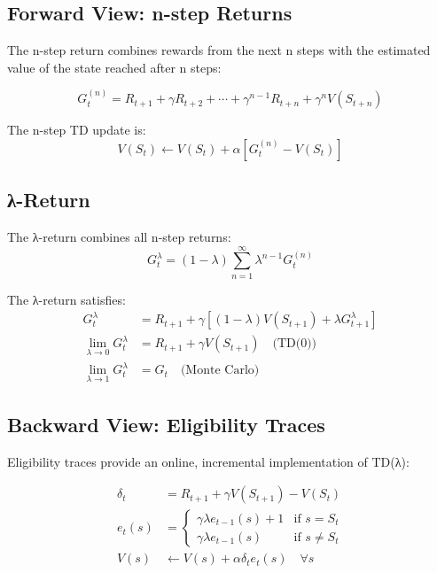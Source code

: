 \subsection{Forward View: n-step Returns}

The n-step return combines rewards from the next n steps with the estimated value of the state reached after n steps:

\begin{equation}
G_t^{(n)} = R_{t+1} + \gamma R_{t+2} + \cdots + \gamma^{n-1} R_{t+n} + \gamma^n V(S_{t+n})
\end{equation}

The n-step TD update is:
\begin{equation}
V(S_t) \leftarrow V(S_t) + \alpha[G_t^{(n)} - V(S_t)]
\end{equation}

\subsection{λ-Return}

The λ-return combines all n-step returns:
\begin{equation}
G_t^\lambda = (1-\lambda) \sum_{n=1}^\infty \lambda^{n-1} G_t^{(n)}
\end{equation}

\begin{theorem}
The λ-return satisfies:
\begin{align}
G_t^\lambda &= R_{t+1} + \gamma[(1-\lambda)V(S_{t+1}) + \lambda G_{t+1}^\lambda] \\
\lim_{\lambda \to 0} G_t^\lambda &= R_{t+1} + \gamma V(S_{t+1}) \quad \text{(TD(0))} \\
\lim_{\lambda \to 1} G_t^\lambda &= G_t \quad \text{(Monte Carlo)}
\end{align}
\end{theorem}

\subsection{Backward View: Eligibility Traces}

Eligibility traces provide an online, incremental implementation of TD(λ):

\begin{align}
\delta_t &= R_{t+1} + \gamma V(S_{t+1}) - V(S_t) \\
e_t(s) &= \begin{cases}
\gamma \lambda e_{t-1}(s) + 1 & \text{if } s = S_t \\
\gamma \lambda e_{t-1}(s) & \text{if } s \neq S_t
\end{cases} \\
V(s) &\leftarrow V(s) + \alpha \delta_t e_t(s) \quad \forall s
\end{align}

